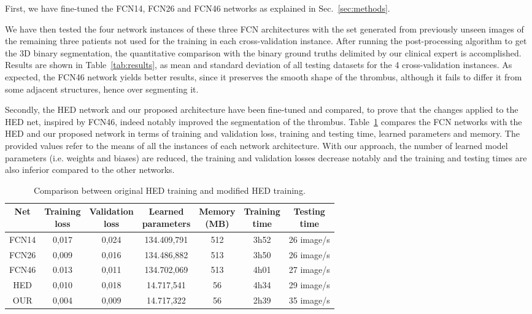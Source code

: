 \documentclass[preprint,authoryear,12pt]{elsarticle}
\begin{document}
First, we have fine-tuned the FCN14, FCN26 and FCN46 networks as explained in Sec.~\ref{sec:methods}. %


We have then tested the four network instances of these three FCN architectures with the set generated from previously unseen images of the remaining three patients not used for the training in each cross-validation instance. After running the post-processing algorithm to get the 3D binary segmentation, the quantitative comparison with the binary ground truths delimited by our clinical expert is accomplished. Results are shown in Table~\ref{tab:results}, as mean and standard deviation of all testing datasets for the 4 cross-validation instances. As expected, the FCN46 network yields better results, since it preserves the smooth shape of the thrombus, although it fails to differ it from some adjacent structures, hence over segmenting it. \par


Secondly, the HED network and our proposed architecture have been fine-tuned and compared, to prove that the changes applied to the HED net, inspired by FCN46, indeed notably improved the segmentation of the thrombus. Table~\ref{tab:Comptraining} compares the FCN networks with the HED and our proposed network in terms of training and validation loss, training and testing time, learned parameters and memory. The provided values refer to the means of all the instances of each network architecture. With our approach, the number of learned model parameters (i.e. weights and biases) are reduced, the training and validation losses decrease notably and the training and testing times are also inferior compared to the other networks.

\begin{table}[htb]
\centering
\begin{tabular}{c|c|c|c|c|c|c}
\hline
Net  &  \thead{Training \\ loss} &  \thead{Validation \\ loss} & \thead{Learned \\ parameters} & \thead{Memory \\ (MB)} & \thead{Training \\ time} & \thead{Testing \\ time} \\
\hline 
FCN14 & 0,017 & 0,024 & 134.409,791 & 512 & 3h52 & 26 image/s\\
FCN26 & 0,009 & 0,016 & 134.486,882 & 513 & 3h50 & 26 image/s\\
FCN46 & 0.013 & 0,011 & 134.702,069 & 513 & 4h01 & 27 image/s\\
HED  & 0,010 & 0,018  & 14.717,541 & 56 & 4h34 & 29 image/s\\
OUR & 0,004  & 0,009 & 14.717,322 & 56 & 2h39 & 35 image/s
\end{tabular}
\caption{\label{tab:Comptraining}Comparison between original HED training and modified HED training.}
\end{table}
\end{document}
